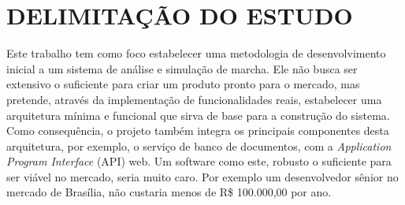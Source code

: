 \section[DELIMITAÇÃO DO ESTUDO]{DELIMITAÇÃO DO ESTUDO}

Este trabalho tem como foco estabelecer uma metodologia de desenvolvimento inicial a um sistema de análise e simulação de marcha. 
Ele não busca ser extensivo o suficiente para criar um produto pronto para o mercado, mas pretende, através da implementação de funcionalidades reais, estabelecer uma arquitetura mínima e funcional que sirva de base para a construção do sistema. 
Como consequência, o projeto também integra os principais componentes desta arquitetura, por exemplo, o serviço de banco de documentos, com a \emph{Application Program Interface} (API) web.
Um software como este, robusto o suficiente para ser viável no mercado, seria muito caro. Por exemplo um desenvolvedor sênior no mercado de Brasília, não custaria menos de R\$ 100.000,00 por ano. 

